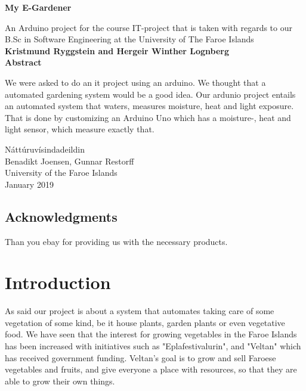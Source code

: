 \documentclass{article}
\begin{document}
\begin{titlepage}
\begin{center}
\vspace{1cm}
\huge
\textbf{My E-Gardener}

\LARGE
\vspace{.5cm}
An Arduino project for the course IT-project that is taken with regards to our B.Sc in Software Engineering at the University of The Faroe Islands \\
\vspace{.5cm}
\textbf{Kristmund Ryggstein and Hergeir Winther Lognberg}\\
\vspace{.5cm}
\Large
\vspace{.5cm}
\Large
\textbf{Abstract}
\end{center}
We were asked to do an it project using an arduino. We thought that a automated gardening system would be a good idea. Our ardunio project entails an automated system that waters, measures moisture, heat and light exposure. That is done by customizing an Arduino Uno which has a moisture-, heat and light sensor, which measure exactly that.

\vfill
\begin{center}	
Náttúruvísindadeildin\\
Benadikt Joensen, Gunnar Restorff\\
University of the Faroe Islands\\
January 2019\\
\end{center}
\end{titlepage}
\tableofcontents
\listoffigures
\listoftables
\pagebreak
{}
\begin{center}\section*{Acknowledgments}\end{center}
Than you ebay for providing us with the necessary products.

\pagebreak
{}
\section{Introduction}

As said our project is about a system that automates taking care of some vegetation of some kind, be it house plants, garden plants or even vegetative food. We have seen that the interest for growing vegetables in the Faroe Islands has been increased with initiatives such as "Eplafestivalurin", and "Veltan" which has received government funding. Veltan's goal is to grow and sell Faroese vegetables and fruits, and give everyone a place with resources, so that they are able to grow their own things. 
\end{document}
